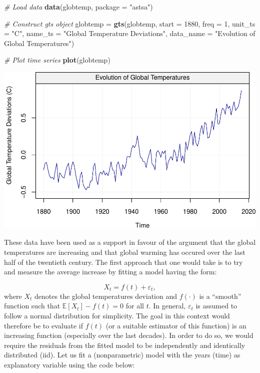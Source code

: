 \documentclass[]{book}
\newenvironment{Shaded}{\begin{snugshade}}{\end{snugshade}}
\newcommand{\CommentTok}[1]{\textcolor[rgb]{0.56,0.35,0.01}{\textit{#1}}}
\newcommand{\DataTypeTok}[1]{\textcolor[rgb]{0.13,0.29,0.53}{#1}}
\newcommand{\DecValTok}[1]{\textcolor[rgb]{0.00,0.00,0.81}{#1}}
\newcommand{\KeywordTok}[1]{\textcolor[rgb]{0.13,0.29,0.53}{\textbf{#1}}}
\newcommand{\NormalTok}[1]{#1}
\newcommand{\StringTok}[1]{\textcolor[rgb]{0.31,0.60,0.02}{#1}}
\theoremstyle{definition}
\theoremstyle{definition}
\theoremstyle{definition}
\theoremstyle{remark}
\begin{document}
\begin{Shaded}
\begin{Highlighting}[]
\CommentTok{# Load data}
\KeywordTok{data}\NormalTok{(globtemp, }\DataTypeTok{package =} \StringTok{"astsa"}\NormalTok{)}

\CommentTok{# Construct gts object}
\NormalTok{globtemp =}\StringTok{ }\KeywordTok{gts}\NormalTok{(globtemp, }\DataTypeTok{start =} \DecValTok{1880}\NormalTok{, }\DataTypeTok{freq =} \DecValTok{1}\NormalTok{, }\DataTypeTok{unit_ts =} \StringTok{"C"}\NormalTok{, }\DataTypeTok{name_ts =} \StringTok{"Global Temperature Deviations"}\NormalTok{, }\DataTypeTok{data_name =} \StringTok{"Evolution of Global Temperatures"}\NormalTok{)}

\CommentTok{# Plot time series}
\KeywordTok{plot}\NormalTok{(globtemp)}
\end{Highlighting}
\end{Shaded}

\begin{center}\includegraphics{ts_files/figure-latex/glotempExample-1} \end{center}

These data have been used as a support in favour of the argument that
the global temperatures are increasing and that global warming has
occured over the last half of the twentieth century. The first approach
that one would take is to try and measure the average increase by
fitting a model having the form:

\[
X_t = f(t) + \varepsilon_t,
\] where \(X_t\) denotes the global temperatures deviation and
\(f(\cdot)\) is a ``smooth'' function such that
\(\mathbb{E}[X_t] - f(t) = 0\) for all \(t\). In general,
\(\varepsilon_t\) is assumed to follow a normal distribution for
simplicity. The goal in this context would therefore be to evaluate if
\(f(t)\) (or a suitable estimator of this function) is an increasing
function (especially over the last decades). In order to do so, we would
require the residuals from the fitted model to be independently and
identically distributed (iid). Let us fit a (nonparametric) model with
the years (time) as explanatory variable using the code below:
\end{document}
